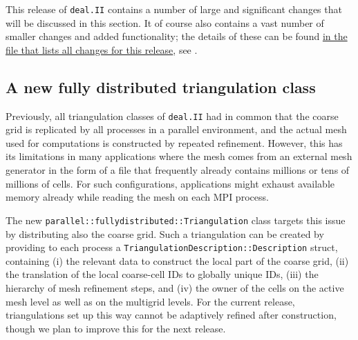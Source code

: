 \documentclass{ansarticle-preprint}
\newcommand{\specialword}[1]{\texttt{#1}}
\newcommand{\dealii}{{\specialword{deal.II}}\xspace}
\begin{document}
This release of \dealii{} contains a number of large and significant changes
that will be discussed in this section.
It of course also contains a
vast number of smaller changes and added functionality; the details of these
can be found
\href{https://dealii.org/developer/doxygen/deal.II/changes_between_9_1_1_and_9_2_0.html}{
  in the file that lists all changes for this release}, see \cite{changes92}.


\subsection{A new fully distributed triangulation class}
\label{subsec:pft}

Previously, all triangulation classes of \dealii{} had in common that the coarse grid is replicated by
all processes in a parallel environment, and the actual mesh used for computations is constructed by repeated
refinement. However, this has its limitations in many
applications where the mesh comes
from an external mesh generator in the form of a file that frequently
already contains millions
or tens of millions of cells. For such configurations, applications might exhaust
available memory already while reading the mesh on each MPI process.

The new \texttt{parallel::fullydistributed::Triangulation} class targets this issue
by distributing also the coarse grid. Such
a triangulation can be created by providing to each process a \texttt{Triangulation\-De\-scrip\-tion::Description} struct, containing
(i) the relevant data to construct the local part of the coarse grid, (ii) the
translation of the local coarse-cell IDs to globally unique IDs, (iii) the hierarchy
of mesh refinement steps, and (iv) the owner of the cells on the active mesh level as well
as on the multigrid levels. For the current release, triangulations set up
this way cannot be adaptively refined after construction, though we plan to
improve this for the next release.

\end{document}
